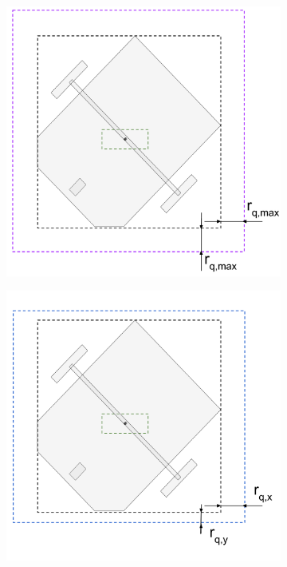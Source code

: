 \begin{figure}[t]
    \centering
    \begin{subfigure}{0.4\textwidth}
        \centering
        \includegraphics[width=\linewidth]{figures/samp/CC1.png}
        \caption{}
        \label{fig:CC1}
    \end{subfigure}
    \begin{subfigure}{0.4\textwidth}
        \centering
        \includegraphics[width=\linewidth]{figures/samp/CC2.png}
        \caption{}
        \label{fig:CC2}
    \end{subfigure}
    

\end{figure}
